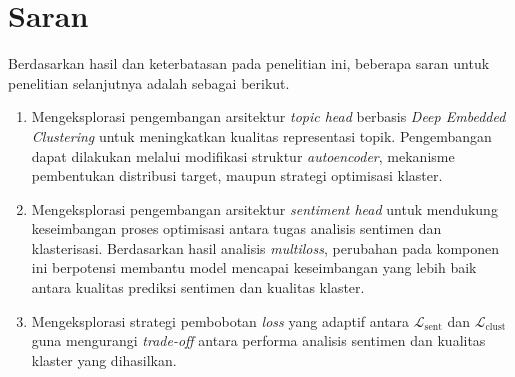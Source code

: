 \section{Saran}

Berdasarkan hasil dan keterbatasan pada penelitian ini, beberapa saran untuk
penelitian selanjutnya adalah sebagai berikut.

\begin{enumerate}
   \item Mengeksplorasi pengembangan arsitektur \textit{topic head} berbasis
    \textit{Deep Embedded Clustering} untuk meningkatkan kualitas representasi
    topik. Pengembangan dapat dilakukan melalui modifikasi struktur
    \textit{autoencoder}, mekanisme pembentukan distribusi target, maupun strategi
    optimisasi klaster.

    \item Mengeksplorasi pengembangan arsitektur \textit{sentiment head} untuk
    mendukung keseimbangan proses optimisasi antara tugas analisis sentimen
    dan klasterisasi. Berdasarkan hasil analisis \textit{multiloss}, perubahan
    pada komponen ini berpotensi membantu model mencapai keseimbangan yang
    lebih baik antara kualitas prediksi sentimen dan kualitas klaster.

    \item Mengeksplorasi strategi pembobotan \textit{loss} yang adaptif antara
    $\mathcal{L}_{\text{sent}}$ dan $\mathcal{L}_{\text{clust}}$ guna
    mengurangi \textit{trade-off} antara performa analisis sentimen dan
    kualitas klaster yang dihasilkan.
\end{enumerate}


